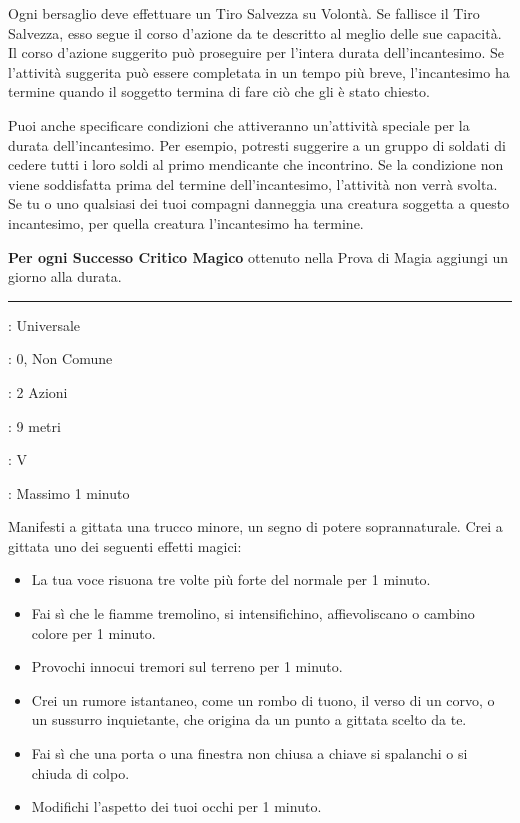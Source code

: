 \begin{multicols}{2}
Ogni bersaglio deve effettuare un Tiro Salvezza su Volontà. Se fallisce il Tiro Salvezza, esso segue il corso d'azione da te descritto al meglio delle sue capacità. Il corso d'azione suggerito può proseguire per l'intera durata dell'incantesimo. Se l'attività suggerita può essere completata in un tempo più breve, l'incantesimo ha termine quando il soggetto termina di fare ciò che gli è stato chiesto.

Puoi anche specificare condizioni che attiveranno un'attività speciale per la durata dell'incantesimo. Per esempio, potresti suggerire a un gruppo di soldati di cedere tutti i loro soldi al primo mendicante che incontrino. Se la condizione non viene soddisfatta prima del termine dell'incantesimo, l'attività non verrà svolta. Se tu o uno qualsiasi dei tuoi compagni danneggia una creatura soggetta a questo incantesimo, per quella creatura l'incantesimo ha termine.

\textbf{Per ogni Successo Critico Magico} ottenuto nella Prova di Magia aggiungi un giorno alla durata.

\smallskip\noindent\rule{\linewidth}{2pt} \hypertarget{Taumaturgia}{}\medskip{}
\noindent
\begin{description}[noitemsep, topsep=0pt, parsep=0pt, partopsep=0pt, leftmargin=0cm, labelwidth=2.8cm]
	\item[\textbf{Lista di Magia}]: Universale
	\item[\textbf{Livello}]: 0, Non Comune
	\item[\textbf{T. di Lancio}]: 2 Azioni
	\item[\textbf{Gittata}]: 9 metri
	\item[\textbf{Componenti}]: V
	\item[\textbf{Durata}]: Massimo 1 minuto
\end{description}

Manifesti a gittata una trucco minore, un segno di potere soprannaturale. Crei a gittata uno dei seguenti effetti magici:

\begin{itemize}[leftmargin=*] \setlength{\itemsep}{0pt}
	\item La tua voce risuona tre volte più forte del normale per 1 minuto.
	\item Fai sì che le fiamme tremolino, si intensifichino, affievoliscano o cambino colore per 1 minuto.
	\item Provochi innocui tremori sul terreno per 1 minuto.
	\item Crei un rumore istantaneo, come un rombo di tuono, il verso di un corvo, o un sussurro inquietante, che origina da un punto a gittata scelto da te.
	\item Fai sì che una porta o una finestra non chiusa a chiave si spalanchi o si chiuda di colpo.
	\item Modifichi l'aspetto dei tuoi occhi per 1 minuto.
\end{itemize}



\end{multicols}
